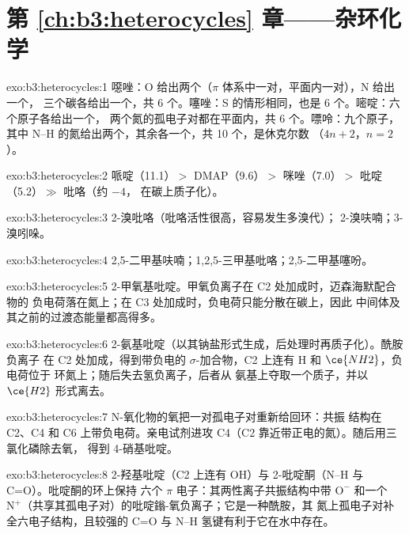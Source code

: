 \section*{第 \ref{ch:b3:heterocycles} 章——杂环化学}

\begin{solution}{exo:b3:heterocycles:1}
噁唑：O 给出两个（$\pi$ 体系中一对，平面内一对），N 给出一个，
三个碳各给出一个，共 6 个。噻唑：S 的情形相同，也是 6 个。嘧啶：六个原子各给出一个，
两个氮的孤电子对都在平面内，共 6 个。嘌呤：九个原子，
其中 N--H 的氮给出两个，其余各一个，共 10 个，是休克尔数
（$4n + 2$，$n = 2$）。
\end{solution}

\begin{solution}{exo:b3:heterocycles:2}
哌啶（11.1）$>$ DMAP（9.6）$>$ 咪唑（7.0）$>$ 吡啶（5.2）$\gg$ 吡咯（约 $-4$，
在碳上质子化）。
\end{solution}

\begin{solution}{exo:b3:heterocycles:3}
2-溴吡咯（吡咯活性很高，容易发生多溴代）；
2-溴呋喃；3-溴吲哚。
\end{solution}

\begin{solution}{exo:b3:heterocycles:4}
2,5-二甲基呋喃；1,2,5-三甲基吡咯；2,5-二甲基噻吩。
\end{solution}

\begin{solution}{exo:b3:heterocycles:5}
2-甲氧基吡啶。甲氧负离子在 C2 处加成时，迈森海默配合物的
负电荷落在氮上；在 C3 处加成时，负电荷只能分散在碳上，因此
中间体及其之前的过渡态能量都高得多。
\end{solution}

\begin{solution}{exo:b3:heterocycles:6}
2-氨基吡啶（以其钠盐形式生成，后处理时再质子化）。酰胺负离子
在 C2 处加成，得到带负电的 $\sigma$-加合物，C2 上连有 H 和 $\ce{NH2}$，负电荷位于
环氮上；随后失去氢负离子，后者从
氨基上夺取一个质子，并以 $\ce{H2}$ 形式离去。
\end{solution}

\begin{solution}{exo:b3:heterocycles:7}
N-氧化物的氧把一对孤电子对重新给回环：共振
结构在 C2、C4 和 C6 上带负电荷。亲电试剂进攻 C4（C2
靠近带正电的氮）。随后用三氯化磷除去氧，
得到 4-硝基吡啶。
\end{solution}

\begin{solution}{exo:b3:heterocycles:8}
2-羟基吡啶（C2 上连有 OH）与 2-吡啶酮（N--H 与 C=O）。吡啶酮的环上保持
六个 $\pi$ 电子：其两性离子共振结构中带 $\mathrm{O^-}$ 和一个
$\mathrm{N^+}$（共享其孤电子对）的吡啶鎓-氧负离子；它是一种酰胺，其
氮上孤电子对补全六电子结构，且较强的 C=O 与 N--H
氢键有利于它在水中存在。
\end{solution}

